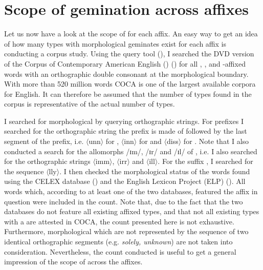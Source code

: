 \section{Scope of gemination across affixes} \label{scope of gemination}

Let us now have a look at the scope of  for each affix. An easy way to get an idea of how many types with morphological {geminates} exist for each affix is conducting a corpus study. Using the query tool  (\citealt{Kunter.2016}), I searched the DVD version of the {Corpus of Contemporary American English ()} (\citealt{Davies.20082014}) for all , ,  and -affixed words with an orthographic double consonant at the morphological boundary. With more than 520 million words  {COCA} is one of the largest available corpora for English. It can therefore be assumed that the number of types found in the corpus is representative of the actual number of types.

I searched for morphological  by querying orthographic strings. For prefixes I searched for the orthographic string the prefix is made of followed by the last segment of the prefix, i.e. $\langle$unn$\rangle$ for ,  $\langle$inn$\rangle$ for  and  $\langle$diss$\rangle$ for . Note that I also conducted a search for the allomorphs /ɪm/, /ɪr/ and /ɪl/ of , i.e. I also searched for the orthographic strings  $\langle$imm$\rangle$, $\langle$irr$\rangle$ and $\langle$ill$\rangle$.  For the suffix , I searched for the sequence $\langle$lly$\rangle$.  I then checked the morphological status of the words found using the {CELEX} database (\citealt{Baayen.1995}) and the {English Lexicon Project (ELP)} (\citealt{Balota.2007}). All words which, according to at least one of the two databases, featured the affix in question were included in the count. 
Note that, due to the fact that the two databases do not feature all existing affixed types, and that not all existing types with a  are attested in  {COCA}, the count presented here is not exhaustive. Furthermore, morphological  which are not represented by the sequence of two identical orthographic segments (e.g. \textit{solely, unknown}) are not taken into consideration. Nevertheless, the count conducted is useful to get a general impression of the scope of  across the affixes.
 
